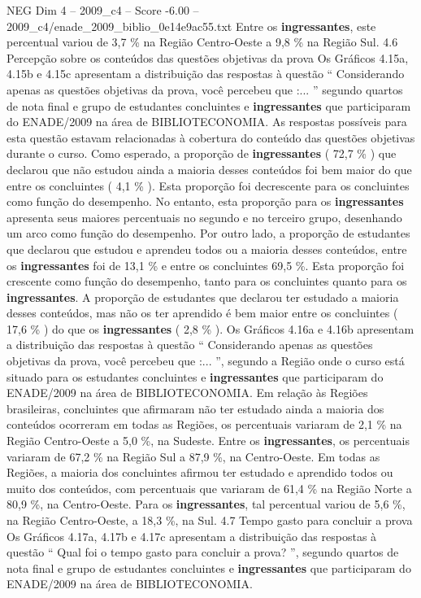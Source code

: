 \begin{textsample}{NEG Dim 4 – 2009\_c4 – Score -6.00 – 2009\_c4/enade\_2009\_biblio\_0e14e9ac55.txt}
Entre os \textbf{ingressantes}, este percentual variou de 3,7 \% na Região Centro-Oeste a 9,8 \% na Região Sul. 4.6 Percepção sobre os conteúdos das questões objetivas da prova Os Gráficos 4.15a, 4.15b e 4.15c apresentam a distribuição das respostas à questão “ Considerando apenas as questões objetivas da prova, você percebeu que :... ” segundo quartos de nota final e grupo de estudantes concluintes e \textbf{ingressantes} que participaram do ENADE/2009 na área de BIBLIOTECONOMIA.
As respostas possíveis para esta questão estavam relacionadas à cobertura do conteúdo das questões objetivas durante o curso.
Como esperado, a proporção de \textbf{ingressantes} ( 72,7 \% ) que declarou que não estudou ainda a maioria desses conteúdos foi bem maior do que entre os concluintes ( 4,1 \% ).
Esta proporção foi decrescente para os concluintes como função do desempenho.
No entanto, esta proporção para os \textbf{ingressantes} apresenta seus maiores percentuais no segundo e no terceiro grupo, desenhando um arco como função do desempenho.
Por outro lado, a proporção de estudantes que declarou que estudou e aprendeu todos ou a maioria desses conteúdos, entre os \textbf{ingressantes} foi de 13,1 \% e entre os concluintes 69,5 \%.
Esta proporção foi crescente como função do desempenho, tanto para os concluintes quanto para os \textbf{ingressantes}.
A proporção de estudantes que declarou ter estudado a maioria desses conteúdos, mas não os ter aprendido é bem maior entre os concluintes ( 17,6 \% ) do que os \textbf{ingressantes} ( 2,8 \% ).
Os Gráficos 4.16a e 4.16b apresentam a distribuição das respostas à questão “ Considerando apenas as questões objetivas da prova, você percebeu que :... ”, segundo a Região onde o curso está situado para os estudantes concluintes e \textbf{ingressantes} que participaram do ENADE/2009 na área de BIBLIOTECONOMIA.
Em relação às Regiões brasileiras, concluintes que afirmaram não ter estudado ainda a maioria dos conteúdos ocorreram em todas as Regiões, os percentuais variaram de 2,1 \% na Região Centro-Oeste a 5,0 \%, na Sudeste.
Entre os \textbf{ingressantes}, os percentuais variaram de 67,2 \% na Região Sul a 87,9 \%, na Centro-Oeste.
Em todas as Regiões, a maioria dos concluintes afirmou ter estudado e aprendido todos ou muito dos conteúdos, com percentuais que variaram de 61,4 \% na Região Norte a 80,9 \%, na Centro-Oeste.
Para os \textbf{ingressantes}, tal percentual variou de 5,6 \%, na Região Centro-Oeste, a 18,3 \%, na Sul. 4.7 Tempo gasto para concluir a prova Os Gráficos 4.17a, 4.17b e 4.17c apresentam a distribuição das respostas à questão “ Qual foi o tempo gasto para concluir a prova? ”, segundo quartos de nota final e grupo de estudantes concluintes e \textbf{ingressantes} que participaram do ENADE/2009 na área de BIBLIOTECONOMIA.

\end{textsample}
